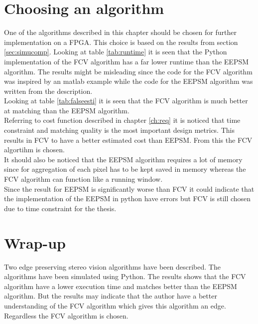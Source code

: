 \section{Choosing an algorithm}
One of the algorithms described in this chapter should be chosen for further implementation on a FPGA. This choice is based on the results from section \vref{sec:simucomp}. Looking at table \ref{tab:runtime} it is seen that the Python implementation of the FCV algorithm has a far lower runtime than the EEPSM algorithm. The results might be misleading since the code for the FCV algorithm was inspired by an matlab example while the code for the EEPSM algorithm was written from the description.\\

Looking at table \vref{tab:falseesti} it is seen that the FCV algorithm is much better at matching than the EEPSM algorithm.\\

Referring to cost function described in chapter \vref{ch:req} it is noticed that time constraint and matching quality is the most important design metrics. This results in FCV to have a better estimated cost than EEPSM. From this the FCV algortihm is chosen.\\

It should also be noticed that the EEPSM algorithm requires a lot of memory since for aggregation of each pixel has to be kept saved in memory whereas the FCV algorithm can function like a running window. \\

Since the result for EEPSM is significantly worse than FCV it could indicate that the implementation of the EEPSM in python have errors but FCV is still chosen due to time constraint for the thesis. 

\section{Wrap-up}
Two edge preserving stereo vision algorithms have been described. The algorithms have been simulated using Python. The results shows that the FCV algorithm have a lower execution time and matches better than the EEPSM algorithm. But the results may indicate that the author have a better understanding of the FCV algorithm which gives this algorithm an edge. Regardless the FCV algorithm is chosen. 